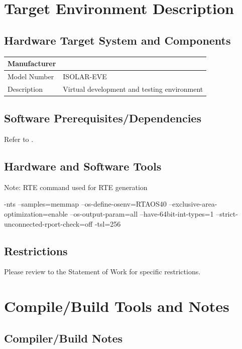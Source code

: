 \section{Target Environment Description}

\subsection{Hardware Target System and Components}
\begin{tabular}{ |l|l| }
	\hline
	{\bfseries Manufacturer} & {\bfseries}\\ \hline
	Model Number & ISOLAR-EVE\\ \hline
	Description & Virtual development and testing environment\\ \hline
\end{tabular}

\subsection{Software Prerequisites/Dependencies}
Refer to .

\subsection{Hardware and Software Tools}


Note: RTE command used for RTE generation

\begin{rtecommandline}
-nts --samples=memmap --os-define-osenv=RTAOS40 --exclusive-area-optimization=enable --os-output-param=all --have-64bit-int-types=1 --strict-unconnected-rport-check=off -tsl=256
\end{rtecommandline}

\subsection{Restrictions}
Please review to the Statement of Work for specific restrictions.

\section{Compile/Build Tools and Notes}

\subsection{Compiler/Build Notes}

